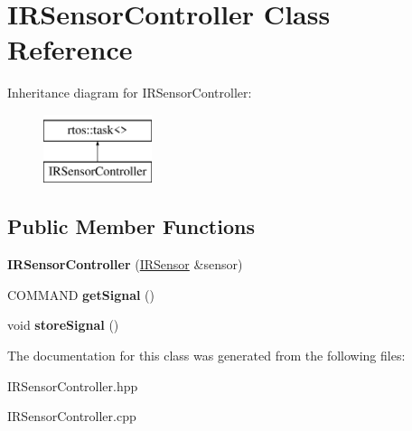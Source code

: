 \hypertarget{class_i_r_sensor_controller}{}\section{I\+R\+Sensor\+Controller Class Reference}
\label{class_i_r_sensor_controller}
Inheritance diagram for I\+R\+Sensor\+Controller\+:\begin{figure}[H]
\begin{center}
\leavevmode
\includegraphics[height=2.000000cm]{class_i_r_sensor_controller}
\end{center}
\end{figure}
\subsection*{Public Member Functions}
\begin{DoxyCompactItemize}
\item 
{\bfseries I\+R\+Sensor\+Controller} (\hyperlink{class_i_r_sensor}{I\+R\+Sensor} \&sensor)\hypertarget{class_i_r_sensor_controller_ac80f10a1bae68d5f70cdd749ae4c580f}{}\label{class_i_r_sensor_controller_ac80f10a1bae68d5f70cdd749ae4c580f}

\item 
C\+O\+M\+M\+A\+ND {\bfseries get\+Signal} ()\hypertarget{class_i_r_sensor_controller_aae3687a0c30ee121d371de0ac4e6ccf0}{}\label{class_i_r_sensor_controller_aae3687a0c30ee121d371de0ac4e6ccf0}

\item 
void {\bfseries store\+Signal} ()\hypertarget{class_i_r_sensor_controller_a2b14c3a18a8a0619eae667b47f0d3556}{}\label{class_i_r_sensor_controller_a2b14c3a18a8a0619eae667b47f0d3556}

\end{DoxyCompactItemize}


The documentation for this class was generated from the following files\+:\begin{DoxyCompactItemize}
\item 
I\+R\+Sensor\+Controller.\+hpp\item 
I\+R\+Sensor\+Controller.\+cpp\end{DoxyCompactItemize}
